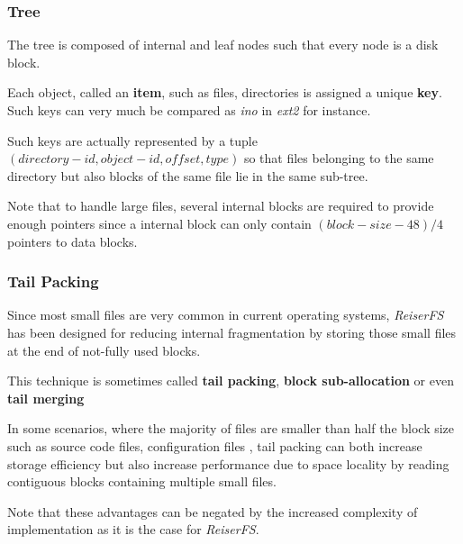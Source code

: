 \begin{frame}
  \frametitle{Tree}

  The tree is composed of internal and leaf nodes such that every node is
  a disk block.

  \-

  Each object, called an \textbf{item}, such as files, directories \etc{} is
  assigned a unique \textbf{key}. Such keys can very much be compared as
  \textit{ino} in \textit{ext2} for instance.

  \-

  Such keys are actually represented by a tuple $(directory-id, object-id,
  offset, type)$ so that files belonging to the same directory but also blocks
  of the same file lie in the same sub-tree.

  \-

  Note that to handle large files, several internal blocks are required to
  provide enough pointers since a internal block can only contain
  $(block-size - 48) / 4$ pointers to data blocks.
\end{frame}


\begin{frame}
  \frametitle{Tail Packing}

  Since most small files are very common in current operating systems,
  \textit{ReiserFS} has been designed for reducing internal fragmentation
  by storing those small files at the end of not-fully used blocks.

  \-

  This technique is sometimes called \textbf{tail packing}, \textbf{block
  sub-allocation} or even \textbf{tail merging}

  \-

  In some scenarios, where the majority of files are smaller than half
  the block size such as source code files, configuration files \etc{}, tail
  packing can both increase storage efficiency but also increase performance
  due to space locality by reading contiguous blocks containing multiple
  small files.

  \-

  Note that these advantages can be negated by the increased complexity
  of implementation as it is the case for \textit{ReiserFS}.
\end{frame}


